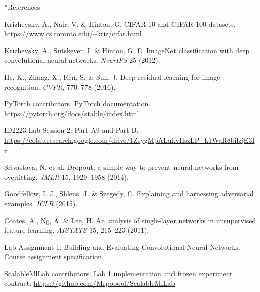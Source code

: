 \documentclass[10pt,a4paper]{article}
\makeatletter
\renewcommand\section{\@startsection{section}{1}{\z@}{-10pt plus -2pt minus -2pt}{4pt plus 1pt}{\normalfont\large\bfseries\color{kthblue}}}
\makeatother
\begin{document}
\section*{References}
\footnotesize
\begin{enumerate}[label={[\arabic*]}, itemsep=1pt, topsep=2pt, leftmargin=2em]
\item Krizhevsky, A., Nair, V. \& Hinton, G. CIFAR-10 and CIFAR-100 datasets. \url{https://www.cs.toronto.edu/~kriz/cifar.html}
\item Krizhevsky, A., Sutskever, I. \& Hinton, G. E. ImageNet classification with deep convolutional neural networks. \textit{NeurIPS} 25 (2012).
\item He, K., Zhang, X., Ren, S. \& Sun, J. Deep residual learning for image recognition. \textit{CVPR}, 770--778 (2016).
\item PyTorch contributors. PyTorch documentation. \url{https://pytorch.org/docs/stable/index.html}
\item ID2223 Lab Session 2: Part A9 and Part B. \url{https://colab.research.google.com/drive/1ZsygMpALqkvHszLP_k1WaR8bilzjE3Iz}
\item Srivastava, N. et al. Dropout: a simple way to prevent neural networks from overfitting. \textit{JMLR} 15, 1929--1958 (2014).
\item Goodfellow, I. J., Shlens, J. \& Szegedy, C. Explaining and harnessing adversarial examples. \textit{ICLR} (2015).
\item Coates, A., Ng, A. \& Lee, H. An analysis of single-layer networks in unsupervised feature learning. \textit{AISTATS} 15, 215--223 (2011).
\item Lab Assignment 1: Building and Evaluating Convolutional Neural Networks. Course assignment specification.
\item ScalableMlLab contributors. Lab 1 implementation and frozen experiment contract. \url{https://github.com/Mrpooool/ScalableMlLab}
\end{enumerate}
\end{document}
